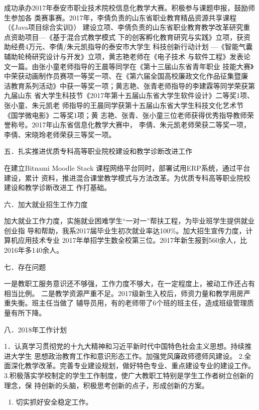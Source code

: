 \documentclass[11pt]{ctexart}
\begin{document}
{{{{成功承办2017年泰安市职业技术院校信息化教学大赛。积极参与课题申报，鼓励师生参加各
类赛事赛。2017年，李倩负责的山东省职业教育精品资源共享课程（《Java项目综合实训》）
建设立项、李倩负责的山东省职业教育教学改革研究重点资助项目—《基于混合式教学模式
下的创客孵化教育研究与实践》立项，获资助经费4万元、李倩/朱元凯指导的泰安市大学生
科技创新行动计划 —《智能气囊辅助轮椅研究设计与开发》立项，黄志艳老师在《电子技术
与软件工程》发表论文一篇。由张小童老师指导的王晨等同学在《第十三届山东省青年职业
技能大赛》中荣获动画制作员赛项一等奖一项、在《第六届全国高校廉政文化作品征集暨廉
洁教育系列活动》中获一等奖一项；黄志艳、张青老师指导的李建霖等同学荣获第九届山东
省大学生科技节《2017年第十五届山东省大学生软件设计》二等奖1项、张小童、朱元凯老
师指导的王晨同学获第十五届山东省大学生科技文化艺术节《国学微电影》二等奖1项；黄
志艳、张青、张小童三位老师获得优秀指导教师荣誉称号。2017年山东省信息化教学大赛中，
李倩、朱元凯老师荣获二等奖一项，李倩、宋晓玲老师荣获三等奖一项。

五．扎实推进优质专科高等职业院校建设和教学诊断改进工作

在建立Bitnami Moodle Stack 课程网络平台同时，部署试用ERP系统，通过平台建设，累计
资料，推进混合课堂教学模式与方法改革。为优质专科高等职业院校建设和教学诊断改进工
作打基础。

六．加大就业招生工作力度

加大就业工作力度，实施就业困难学生“一对一”帮扶工程，为毕业班学生提供就业创业指
导和帮助，我系2017届毕业生初次就业率达100\%。加大招生宣传力度，计算机应用技术专业
2017年单招学生数全校第三位。2017年新生报到560余人，比2016年多140余人。

七．存在问题

一是教职工服务意识还不够强，工作力度不够大，在一定程度上，被动工作还占有相当比例。
二是教学资源严重不足。2017级新生入校后，师资力量和教学用房严重失衡。班主任当做了
辅导员用，有的老师带了6个班的班主任，造成班级管理质量有所下降。

八．2018年工作计划

1．认真学习贯彻党的十九大精神和习近平新时代中国特色社会主义思想。持续推进大学生
思想政治教育工作和意识形态工作。加强党风廉政师德师风建设。
2.全面深化教学改革。完善专业建设规划，做好特色专业、重点建设专业的建设工作。
3.积极落实学校制定的学生工作制度，使广大教职工特别是学生工作者树立创新的理念，保
持创新的头脑，积极思考创新的点子，形成创新的方案。
\begin{enumerate}
\item 切实抓好安全稳定工作。
\end{enumerate}


}}}}
\end{document}
